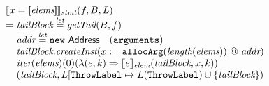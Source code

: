 \[\begin{array}{l@{}l@{~}l}
\lefteqn{\transfun{\irarray{x}{\emph{elems}}}_{\emph{stmt}}(f, B, L)}\\
& = & \emph{tailBlock} \letval \getTail(B, f)\\
& & \emph{addr} \letval \new\ \Address \quad (\TT{arguments})\\
& & \emph{tailBlock}.\emph{createInst}(x := \TT{allocArg}(\length(\emph{elems})) ~@~ \emph{addr})\\
& & \iter(\emph{elems})(0)(\lambda(e,k) \Rightarrow \transfun{e}_{\emph{elem}}(\emph{tailBlock}, x, k))\\
& & (\emph{tailBlock}, L[\ThrowLabel \mapsto L(\ThrowLabel) \cup \{ \emph{tailBlock} \})\\
& & \\

\end{array}
\]

